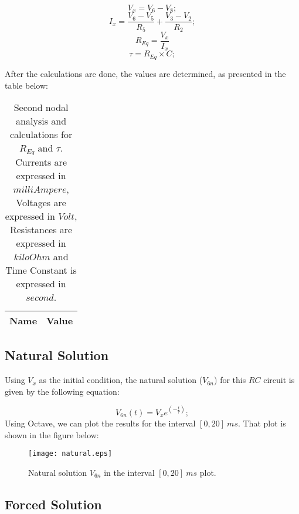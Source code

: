 \begin{equation}
V_x=V_6-V_8;
\end{equation}
\begin{equation}
I_x=\frac {V_6-V_5}{R_5}+\frac {V_3-V_2}{R_2};
\end{equation}
\begin{equation}
	R_{Eq}=\frac {V_x}{I_x}
\end{equation}
\begin{equation}
	\tau=R_{Eq}\times C;
\end{equation}


After the calculations are done, the values are determined, as presented in the table below:

\begin{table}[h]
  \centering
  \begin{tabular}{|l|r|}
    \hline    
    {\bf Name} & {\bf Value} \\ \hline
     
  \end{tabular}
  \caption{Second nodal analysis and calculations for $R_{Eq}$ and $\tau$. Currents are expressed in $milliAmpere$, Voltages are expressed in $Volt$, Resistances are expressed in $kiloOhm$ and Time Constant is expressed in $second$.}
  \label{tab:theoretical2}
\end{table}

\subsection{Natural Solution}


Using $V_x$ as the initial condition, the natural solution ($V_{6n}$) for this $RC$ circuit is given by the following equation:

\newcommand{\euler}{e}

\begin{equation}
	V_{6n}(t)=V_x e^{(-\frac{t}{\tau})};
\end{equation}
Using Octave, we can plot the results for the interval $[0, 20]~ms$. That plot is shown in the figure below:


\begin{figure}[h] \centering
\texttt{[image: natural.eps]}
	\caption{Natural solution $V_{6n}$ in the interval $[0, 20]~ms$ plot.}
\label{fig:natural}
\end{figure}


\subsection{Forced Solution}

